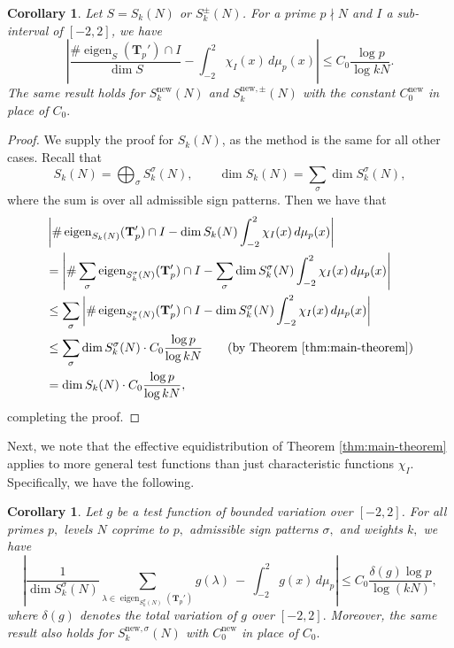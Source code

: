 \documentclass[11pt,letterpaper,reqno]{amsart}
\newtheorem{corollary}[theorem]{Corollary}
\theoremstyle{definition}
\numberwithin{equation}{section}
\numberwithin{figure}{section}
\numberwithin{table}{section}
\newcommand{\nw}{\mathrm{new}}
\begin{document}
\begin{corollary} \label{cor:main-theorem-for-larger-spaces}
    Let $S = S_k(N)$ or $S_k^\pm(N)$. For a prime $p \nmid N$ and $I$ a sub-interval of $[-2, 2]$, we have
    $$\left| \frac{\# \operatorname{eigen}_S(\mathbf{T}_p') \cap I}{\dim S} - \int_{-2}^2 \chi_I(x) \, d \mu_p(x)  \right| \leq C_0  \frac{\log p}{\log  kN}.$$
    The same result holds for $S_k^{\nw}(N)$ and $S_k^{\nw, \pm}(N)$ with the constant $C_0^{\nw}$ in place of $C_0.$
\end{corollary}

\begin{proof}
    We supply the proof for $S_k(N)$, as the method is the same for all other cases. Recall that
    $$S_k(N) = \bigoplus_{\sigma} S_k^\sigma(N),   \qquad \dim S_k(N) = \sum_{\sigma} \dim S_k^\sigma(N),$$
    where the sum is over all admissible sign patterns. Then we have that
    \begin{align}
        &\left| \# \operatorname{eigen}_{S_k(N)}(\mathbf{T}_p') \cap I  - \dim S_k (N) \int_{-2}^2 \chi_I(x) \, d\mu_p(x) \right|\\
        & = \left| \# \sum_{\sigma} \operatorname{eigen}_{S_k^\sigma(N)}(\mathbf{T}_p') \cap I  - \sum_{\sigma} \dim S_k^\sigma (N) \int_{-2}^2 \chi_I(x) \, d\mu_p(x) \right|\\
        &\leq \sum_{\sigma} \left| \# \operatorname{eigen}_{S_k^\sigma(N)}(\mathbf{T}_p') \cap I - \dim S_k^\sigma (N) \int_{-2}^2 \chi_I(x) \, d\mu_p(x) \right| \quad\quad \\
        &\leq \sum_{\sigma} \dim S_k^\sigma(N) \cdot C_0 \frac{\log p}{\log kN} \qquad \text{(by Theorem \ref{thm:main-theorem})}\\
        &= \dim S_k(N) \cdot C_0 \frac{\log p}{\log kN},
    \end{align}
    completing the proof.
\end{proof}


Next, we note that the effective equidistribution of Theorem \ref{thm:main-theorem} applies to more general test functions than just characteristic functions $\chi_I.$ Specifically, we have the following.

\begin{corollary}\label{cor:main-thm-for-general-function-g}
    Let $g$ be a test function of bounded variation over $[-2, 2]$. For all primes $p,$ levels $N$ coprime to $p,$ admissible sign patterns $\sigma,$ and weights $k,$ we have 
    \begin{equation}
    \left| \frac{1}{\dim S_k^\sigma(N)} \sum_{\lambda \in \operatorname{eigen}_{S_k^\sigma(N)}(\mathbf{T}_p')} g\left( \lambda  \right) \ -\  \int_{-2}^2 g(x) \,d\mu_p \right| \le C_0 \frac{\delta(g)\log p}{\log (k N)},
\end{equation}
    where $\delta(g)$ denotes the total variation of $g$ over $[-2, 2].$ Moreover, the same result also holds for $S_k^{\nw,\sigma}(N)$ with $C_0^\nw$ in place of $C_0.$
\end{corollary}
\end{document}
